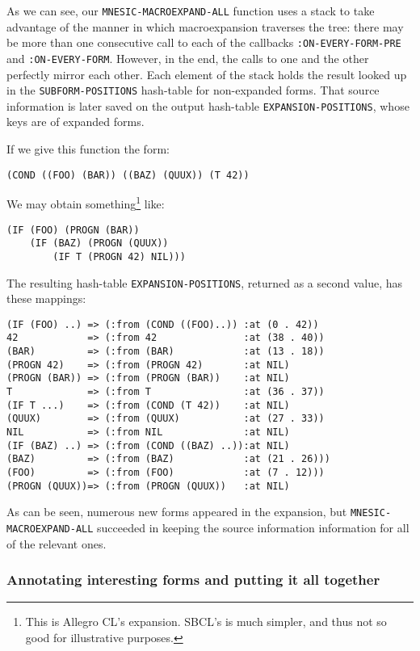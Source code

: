 \documentclass[format=sigconf]{acmart}
\begin{document}
As we can see, our \texttt{MNESIC-MACROEXPAND-ALL} function uses a
stack to take advantage of the manner in which macroexpansion
traverses the tree: there may be more than one consecutive call to
each of the callbacks \texttt{:ON-EVERY-FORM-PRE} and
\texttt{:ON-EVERY-FORM}.  However, in the end, the calls to one and
the other perfectly mirror each other.  Each element of the stack
holds the result looked up in the \texttt{SUBFORM-POSITIONS}
hash-table for non-expanded forms.  That source information is later
saved on the output hash-table \texttt{EXPANSION-POSITIONS}, whose
keys are of expanded forms.

If we give this function the form:

\begin{verbatim}
(COND ((FOO) (BAR)) ((BAZ) (QUUX)) (T 42))
\end{verbatim}

We may obtain something\footnote{This is Allegro CL's
  expansion.  SBCL's is much simpler, and thus not so good for
  illustrative purposes.} like:

\begin{verbatim}
(IF (FOO) (PROGN (BAR))
    (IF (BAZ) (PROGN (QUUX))
        (IF T (PROGN 42) NIL)))
\end{verbatim}

The resulting hash-table \texttt{EXPANSION-POSITIONS}, returned as a
second value, has these mappings:

\begin{verbatim}
(IF (FOO) ..) => (:from (COND ((FOO)..)) :at (0 . 42))
42            => (:from 42               :at (38 . 40))
(BAR)         => (:from (BAR)            :at (13 . 18))
(PROGN 42)    => (:from (PROGN 42)       :at NIL)
(PROGN (BAR)) => (:from (PROGN (BAR))    :at NIL)
T             => (:from T                :at (36 . 37))
(IF T ...)    => (:from (COND (T 42))    :at NIL)
(QUUX)        => (:from (QUUX)           :at (27 . 33))
NIL           => (:from NIL              :at NIL)
(IF (BAZ) ..) => (:from (COND ((BAZ) ..)):at NIL)
(BAZ)         => (:from (BAZ)            :at (21 . 26)))
(FOO)         => (:from (FOO)            :at (7 . 12)))
(PROGN (QUUX))=> (:from (PROGN (QUUX))   :at NIL)
\end{verbatim}

As can be seen, numerous new forms appeared in the expansion, but
\texttt{MNESIC-MACROEXPAND-ALL} succeeded in keeping the source
information information for all of the relevant ones.

\subsubsection{Annotating interesting forms and putting it all
  together}\label{collecting-interesting-forms}
\end{document}
